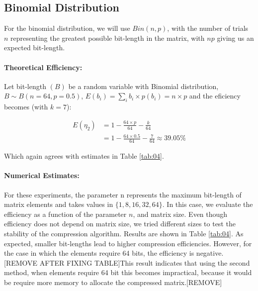 \documentclass[10pt]{article}
\begin{document}
\subsection*{Binomial Distribution}

For the binomial distribution, we will use $Bin(n, p)$, with the number of trials $n$ representing the greatest possible bit-length in the matrix, with $np$ giving us an expected bit-length.

\paragraph{Theoretical Efficiency:}
Let bit-length $(B)$ be a random variable with Binomial distribution, $B \sim B(n=64,p=0.5)$, $E(b_i) = \sum_{i} b_i \times p(b_i) = n \times p$ and the eficiency becomes (with $k=7$):

\begin{align}\label{eq:47}
 E(\eta_2) &= 1 - \frac{64 \times p }{64} - \frac{k}{64}  \\
  &= 1 - \frac{64 \times 0.5 }{64} - \frac{7}{64} \approx 39.05\% \nonumber
\end{align}

Which again agrees with estimates in Table \ref{tab:04}.
\paragraph{Numerical Estimates:}
For these experiments, the parameter n represents the maximum bit-length of matrix elements and takes values in $\{1, 8, 16, 32, 64\}$. In this case, we evaluate the efficiency as a function of the parameter $n$, and matrix size. Even though efficiency does not depend on matrix size, we tried different sizes to test the stability of the compression algorithm. Results are shown in Table \ref{tab:04}. As expected, smaller bit-lengths lead to higher compression efficiencies. However, for the case in which the elements require 64 bits, the efficiency is negative. [REMOVE AFTER FIXING TABLE]This result indicates that using the second method, when elements require 64 bit this becomes impractical, because it would be require more memory to allocate the compressed matrix.[REMOVE]
\end{document}
